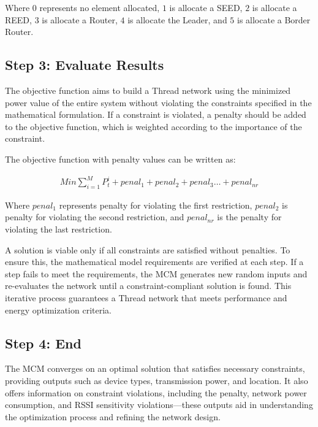     Where $0$ represents no element allocated, $1$ is allocate a SEED, $2$ is allocate a REED, $3$ is allocate a Router, $4$ is allocate the Leader, and $5$ is allocate a Border Router.
\vspace{2mm}

\subsection{Step 3: Evaluate Results}\label{sec:monte_carlo_method_step_3}
The objective function aims to build a Thread network using the minimized power value of the entire system without violating the constraints specified in the mathematical formulation. If a constraint is violated, a penalty should be added to the objective function, which is weighted according to the importance of the constraint.

The objective function with penalty values can be written as:

\begin{equation}\label{eq:objective_function}
    \begin{aligned}
        Min\sum_{i=1}^{M}P_t^i+penal_1+penal_2+penal_3\ldots+penal_{nr}
    \end{aligned}
\end{equation}

    Where $penal_1$ represents penalty for violating the first restriction, $penal_2$ is penalty for violating the second restriction, and $penal_{nr}$ is the penalty for violating the last restriction.
\vspace{2mm}

A solution is viable only if all constraints are satisfied without penalties. To ensure this, the mathematical model requirements are verified at each step. If a step fails to meet the requirements, the MCM generates new random inputs and re-evaluates the network until a constraint-compliant solution is found. This iterative process guarantees a Thread network that meets performance and energy optimization criteria.

\subsection{Step 4: End}\label{sec:monte_carlo_method_step_4}
The MCM converges on an optimal solution that satisfies necessary constraints, providing outputs such as device types, transmission power, and location. It also offers information on constraint violations, including the penalty, network power consumption, and RSSI sensitivity violations—these outputs aid in understanding the optimization process and refining the network design.


